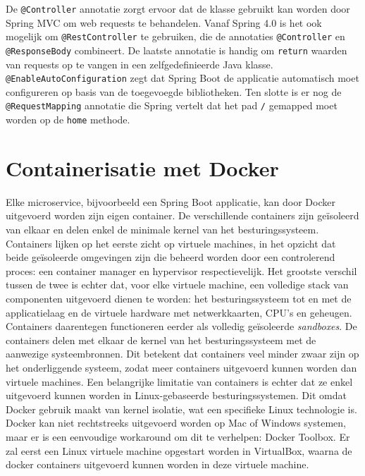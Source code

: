 De \texttt{@Controller} annotatie zorgt ervoor dat de klasse gebruikt kan worden door Spring MVC om web requests te behandelen. Vanaf Spring 4.0 is het ook mogelijk om \texttt{@RestController} te gebruiken, die de annotaties \texttt{@Controller} en \texttt{@ResponseBody} combineert. De laatste annotatie is handig om \texttt{return} waarden van requests op te vangen in een zelfgedefinieerde Java klasse. \texttt{@EnableAutoConfiguration} zegt dat Spring Boot de applicatie automatisch moet configureren op basis van de toegevoegde bibliotheken. Ten slotte is er nog de \texttt{@RequestMapping} annotatie die Spring vertelt dat het pad \texttt{/} gemapped moet worden op de \texttt{home} methode. \\

\section{Containerisatie met Docker}
\label{sec:docker}

Elke microservice, bijvoorbeeld een Spring Boot applicatie, kan door Docker uitgevoerd worden zijn eigen container. De verschillende containers zijn geïsoleerd van elkaar en delen enkel de minimale kernel van het besturingssysteem. Containers lijken op het eerste zicht op virtuele machines, in het opzicht dat beide geïsoleerde omgevingen zijn die beheerd worden door een controlerend proces: een container manager en hypervisor respectievelijk. Het grootste verschil tussen de twee is echter dat, voor elke virtuele machine, een volledige stack van componenten uitgevoerd dienen te worden: het besturingssysteem tot en met de applicatielaag en de virtuele hardware met netwerkkaarten, CPU's en geheugen. \\

Containers daarentegen functioneren eerder als volledig geïsoleerde \textit{sandboxes}. De containers delen met elkaar de kernel van het besturingssysteem met de aanwezige systeembronnen. Dit betekent dat containers veel minder zwaar zijn op het onderliggende systeem, zodat meer containers uitgevoerd kunnen worden dan virtuele machines. Een belangrijke limitatie van containers is echter dat ze enkel uitgevoerd kunnen worden in Linux-gebaseerde besturingssystemen. Dit omdat Docker gebruik maakt van kernel isolatie, wat een specifieke Linux technologie is. \\

Docker kan niet rechtstreeks uitgevoerd worden op Mac of Windows systemen, maar er is een eenvoudige workaround om dit te verhelpen: Docker Toolbox. Er zal eerst een Linux virtuele machine opgestart worden in VirtualBox, waarna de docker containers uitgevoerd kunnen worden in deze virtuele machine. \\

